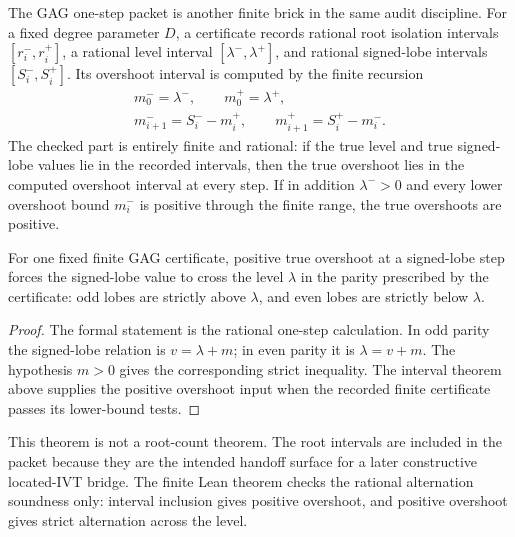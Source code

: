 The GAG one-step packet is another finite brick in the same audit
discipline.  For a fixed degree parameter $D$, a certificate records
rational root isolation intervals $[r_i^-,r_i^+]$, a rational level
interval $[\lambda^-,\lambda^+]$, and rational signed-lobe intervals
$[S_i^-,S_i^+]$.  Its overshoot interval is computed by the finite
recursion
$$
\begin{gathered}
m_0^-=\lambda^-,
\qquad
m_0^+=\lambda^+,\\
m_{i+1}^- = S_i^- - m_i^+,
\qquad
m_{i+1}^+ = S_i^+ - m_i^-.
\end{gathered}
$$
The checked part is entirely finite and rational: if the true level and
true signed-lobe values lie in the recorded intervals, then the true
overshoot lies in the computed overshoot interval at every step.  If in
addition $\lambda^->0$ and every lower overshoot bound $m_i^-$ is
positive through the finite range, the true overshoots are positive.

\begin{theorem}
\label{thm:rh-gag-finite-alternation-soundness}
For one fixed finite GAG certificate, positive true overshoot at a
signed-lobe step forces the signed-lobe value to cross the level
$\lambda$ in the parity prescribed by the certificate: odd lobes are
strictly above $\lambda$, and even lobes are strictly below $\lambda$.
\end{theorem}

\begin{proof}
The formal statement is the rational one-step calculation.  In odd
parity the signed-lobe relation is $v=\lambda+m$; in even parity it is
$\lambda=v+m$.  The hypothesis $m>0$ gives the corresponding strict
inequality.  The interval theorem above supplies the positive overshoot
input when the recorded finite certificate passes its lower-bound tests.
\end{proof}

This theorem is not a root-count theorem.  The root intervals are
included in the packet because they are the intended handoff surface for
a later constructive located-IVT bridge.  The finite Lean theorem checks
the rational alternation soundness only: interval inclusion gives
positive overshoot, and positive overshoot gives strict alternation
across the level.

